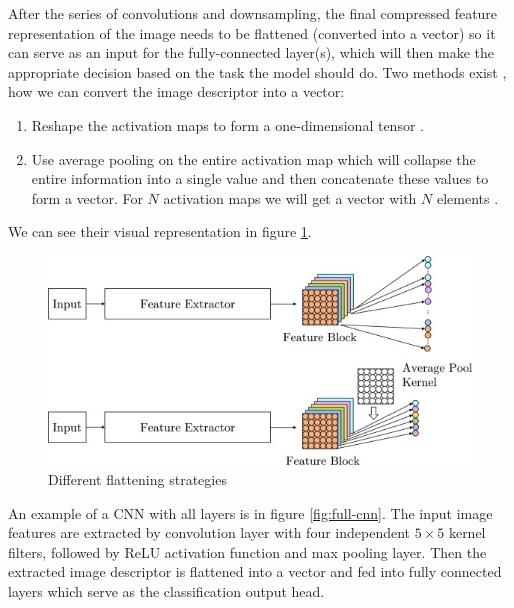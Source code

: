After the series of convolutions and downsampling, the final compressed feature representation of the image needs to be flattened (converted into a vector) so it can serve as an input for the fully-connected layer(s), which will then make the appropriate decision based on the task the model should do. Two methods exist \cite{Santosh2022-2}, how we can convert the image descriptor into a vector:

\begin{enumerate}
    \item Reshape the activation maps to form a one-dimensional tensor \cite{Krizhevsky2012, LeCun2015-2}.
    \item Use average pooling on the entire activation map which will collapse the entire information into a single value and then concatenate these values to form a vector. For $N$ activation maps we will get a vector with $N$ elements \cite{He2016, Szegedy2015}.
\end{enumerate}

We can see their visual representation in figure \ref{fig:flatenning}.

\begin{figure}[H]
\begin{centering}
\includegraphics[width=12cm]{assets/images/flattening.jpg}
\par\end{centering}
\caption{Different flattening strategies \cite{Santosh2022-2}}
\label{fig:flatenning}
\end{figure}

An example of a CNN with all layers is in figure \ref{fig:full-cnn}. The input image features are extracted by convolution layer with four independent $5\!\times\!5$ kernel filters, followed by ReLU activation function and max pooling layer. Then the extracted image descriptor is flattened into a vector and fed into fully connected layers which serve as the classification output head.


